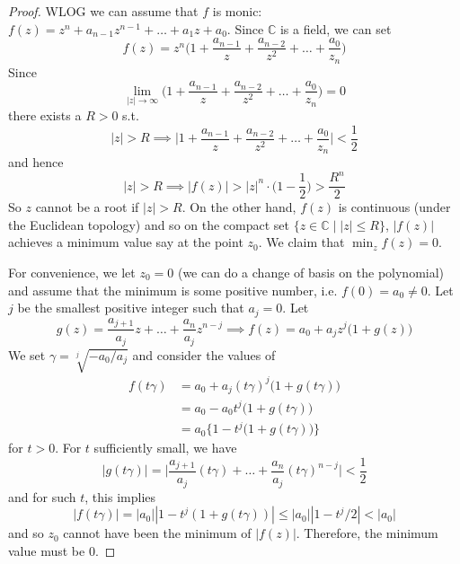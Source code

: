   \begin{proof}
    WLOG we can assume that $f$ is monic: $f(z) = z^n + a_{n-1} z^{n-1} + \ldots + a_1 z + a_0$. Since $\mathbb{C}$ is a field, we can set 
    \begin{equation}
      f(z) = z^n \bigg( 1 + \frac{a_{n-1}}{z} + \frac{a_{n-2}}{z^2} + \ldots + \frac{a_0}{z_n} \bigg)
    \end{equation} 
    Since 
    \begin{equation}
      \lim_{|z| \rightarrow \infty} \bigg( 1 + \frac{a_{n-1}}{z} + \frac{a_{n-2}}{z^2} + \ldots + \frac{a_0}{z_n} \bigg) = 0
    \end{equation}
    there exists a $R > 0$ s.t. 
    \begin{equation}
      |z| > R \implies \bigg| 1 + \frac{a_{n-1}}{z} + \frac{a_{n-2}}{z^2} + \ldots + \frac{a_0}{z_n} \bigg| < \frac{1}{2}
    \end{equation}
    and hence 
    \begin{equation}
      |z| > R \implies |f(z)| > |z|^n \cdot \bigg( 1 - \frac{1}{2} \bigg) > \frac{R^n}{2}
    \end{equation}
    So $z$ cannot be a root if $|z| > R$. On the other hand, $f(z)$ is continuous (under the Euclidean topology) and so on the compact set $\{z \in \mathbb{C} \mid |z| \leq R\}$, $|f(z)|$ achieves a minimum value say at the point $z_0$. We claim that $\min_z f(z) = 0$. 

    For convenience, we let $z_0 = 0$ (we can do a change of basis on the polynomial) and assume that the minimum is some positive number, i.e. $f(0) = a_0 \neq 0$. Let $j$ be the smallest positive integer such that $a_j = 0$. Let 
    \begin{equation}
      g(z) = \frac{a_{j+1}}{a_j} z + \ldots + \frac{a_n}{a_j} z^{n-j} \implies f(z) = a_0 + a_j z^j \big( 1 + g(z) \big) 
    \end{equation}
    We set $\gamma = \sqrt[j]{-a_0/a_j}$ and consider the values of 
    \begin{align}
      f(t \gamma) & = a_0 + a_j (t\gamma)^j \big( 1 + g(t\gamma) \big) \\
                  & = a_0 - a_0 t^j \big(1 + g(t \gamma) \big) \\
                  & = a_0 \big\{ 1 - t^j \big(1 + g(t \gamma) \big) \big\}
    \end{align} 
    for $t > 0$. For $t$ sufficiently small, we have 
    \begin{equation}
      |g(t \gamma)| = \bigg| \frac{a_{j+1}}{a_j} (t \gamma) + \ldots + \frac{a_n}{a_j} (t \gamma)^{n-j} \bigg| < \frac{1}{2} 
    \end{equation}
    and for such $t$, this implies 
    \begin{equation}
      |f(t \gamma)| = |a_0| |1 - t^j (1 + g(t \gamma))| \leq |a_0| |1 - t^j/2| < |a_0|
    \end{equation}
    and so $z_0$ cannot have been the minimum of $|f(z)|$. Therefore, the minimum value must be $0$.  
  \end{proof}

